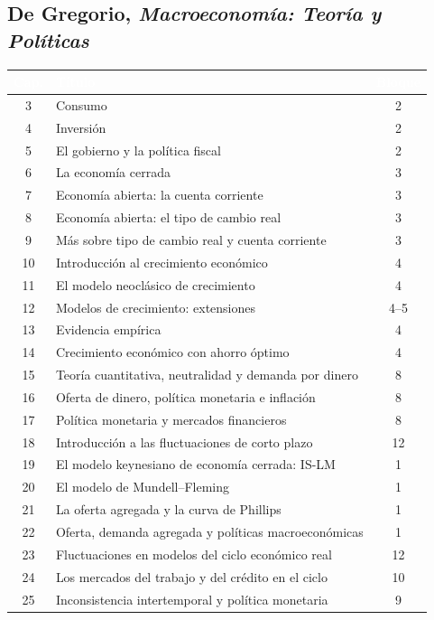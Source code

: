 \documentclass[11pt,a4paper]{article}
\newcommand{\cab}[1]{\textcolor{white}{\sffamily\bfseries #1}}
\newcommand{\filasalternas}{\rowcolors{2}{white}{tonoPalido}}
\begin{document}
\subsection*{De Gregorio, \emph{Macroeconomía: Teoría y Políticas}}
{\filasalternas
\noindent\begin{tabularx}{\textwidth}{cXc}
\toprule
\rowcolor{tonoOscuro}\cab{Cap.} & \cab{Título} & \cab{Bloque} \\
\midrule
3  & Consumo & 2 \\
4  & Inversión & 2 \\
5  & El gobierno y la política fiscal & 2 \\
6  & La economía cerrada & 3 \\
7  & Economía abierta: la cuenta corriente & 3 \\
8  & Economía abierta: el tipo de cambio real & 3 \\
9  & Más sobre tipo de cambio real y cuenta corriente & 3 \\
10 & Introducción al crecimiento económico & 4 \\
11 & El modelo neoclásico de crecimiento & 4 \\
12 & Modelos de crecimiento: extensiones & 4--5 \\
13 & Evidencia empírica & 4 \\
14 & Crecimiento económico con ahorro óptimo & 4 \\
15 & Teoría cuantitativa, neutralidad y demanda por dinero & 8 \\
16 & Oferta de dinero, política monetaria e inflación & 8 \\
17 & Política monetaria y mercados financieros & 8 \\
18 & Introducción a las fluctuaciones de corto plazo & 12 \\
19 & El modelo keynesiano de economía cerrada: IS-LM & 1 \\
20 & El modelo de Mundell--Fleming & 1 \\
21 & La oferta agregada y la curva de Phillips & 1 \\
22 & Oferta, demanda agregada y políticas macroeconómicas & 1 \\
23 & Fluctuaciones en modelos del ciclo económico real & 12 \\
24 & Los mercados del trabajo y del crédito en el ciclo & 10 \\
25 & Inconsistencia intertemporal y política monetaria & 9 \\
\bottomrule
\end{tabularx}
}
\end{document}
